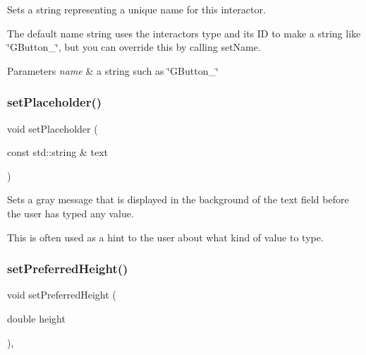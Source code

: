 Sets a string representing a unique name for this interactor. 

The default name string uses the interactor\textquotesingle{}s type and its ID to make a string like \char`\"{}\+G\+Button\+\_\char`\"{}, but you can override this by calling set\+Name. 
\begin{DoxyParams}{Parameters}
{\em name} & a string such as \char`\"{}\+G\+Button\+\_\char`\"{} \\
\hline
\end{DoxyParams}
\mbox{\label{classsgl_1_1GTextField_aa21a9bebb4652ab6780d0c11eff47aee}} 
\subsubsection{\texorpdfstring{set\+Placeholder()}{setPlaceholder()}}
{\footnotesize\ttfamily void set\+Placeholder (\begin{DoxyParamCaption}\item[{const std\+::string \&}]{text }\end{DoxyParamCaption})\hspace{0.3cm}{\ttfamily [virtual]}}



Sets a gray message that is displayed in the background of the text field before the user has typed any value. 

This is often used as a hint to the user about what kind of value to type. \mbox{\label{classsgl_1_1GInteractor_a1ab987704fce32098706c6f00fb08218}} 
\subsubsection{\texorpdfstring{set\+Preferred\+Height()}{setPreferredHeight()}}
{\footnotesize\ttfamily void set\+Preferred\+Height (\begin{DoxyParamCaption}\item[{double}]{height }\end{DoxyParamCaption})\hspace{0.3cm}{\ttfamily [virtual]}, {\ttfamily [inherited]}}




